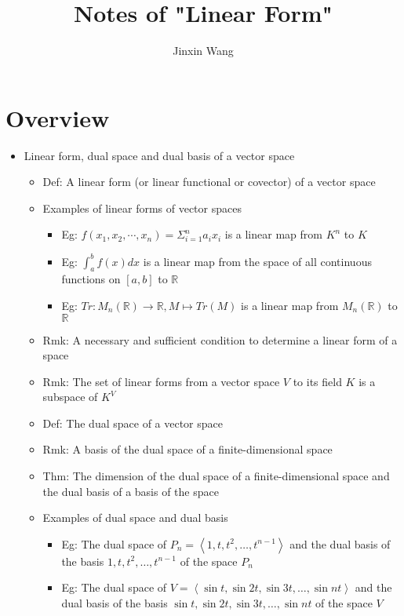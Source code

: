 \documentclass[onecolumn]{ctexart}
\title{Notes of "Linear Form"}
\author{Jinxin Wang}
\date{}
\begin{document}
\maketitle

\section{Overview}
\begin{itemize}
  \item Linear form, dual space and dual basis of a vector space
  \begin{itemize}
    \item Def: A linear form (or linear functional or covector) of a vector space
    \item Examples of linear forms of vector spaces
    \begin{itemize}
      \item Eg: $f(x_1, x_2, \cdots, x_n) = \Sigma_{i=1}^n a_ix_i$ is a linear map from $K^n$ to $K$
      \item Eg: $\int_a^b f(x)dx$ is a linear map from the space of all continuous functions on $\left[ a, b \right]$ to $\mathbb{R}$
      \item Eg: $Tr: M_n(\mathbb{R}) \to \mathbb{R}, M \mapsto Tr(M)$ is a linear map from $M_n(\mathbb{R})$ to $\mathbb{R}$
    \end{itemize}
    \item Rmk: A necessary and sufficient condition to determine a linear form of a space
    \item Rmk: The set of linear forms from a vector space $V$ to its field $K$ is a subspace of $K^V$
    \item Def: The dual space of a vector space
    \item Rmk: A basis of the dual space of a finite-dimensional space
    \item Thm: The dimension of the dual space of a finite-dimensional space and the dual basis of a basis of the space
    \item Examples of dual space and dual basis
    \begin{itemize}
      \item Eg: The dual space of $P_n = \left\langle 1, t, t^2, \ldots, t^{n-1} \right\rangle$ and the dual basis of the basis $1, t, t^2, \ldots, t^{n-1}$ of the space $P_n$
      \item Eg: The dual space of $V = \left\langle \sin t, \sin 2t, \sin 3t, \ldots, \sin nt \right\rangle$ and the dual basis of the basis $\sin t, \sin 2t, \sin 3t, \ldots, \sin nt$ of the space $V$

\end{itemize}
\end{itemize}
\end{itemize}
\end{document}
